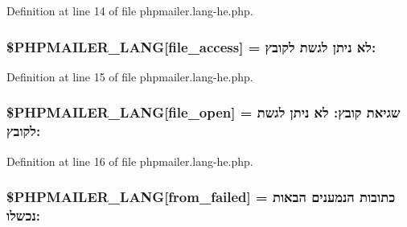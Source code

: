 Definition at line 14 of file phpmailer.\+lang-\/he.\+php.

\subsubsection[{\texorpdfstring{\$\+P\+H\+P\+M\+A\+I\+L\+E\+R\+\_\+\+L\+A\+NG}{$PHPMAILER_LANG}}]{\setlength{\rightskip}{0pt plus 5cm}\$P\+H\+P\+M\+A\+I\+L\+E\+R\+\_\+\+L\+A\+NG\mbox{[}\textquotesingle{}file\+\_\+access\textquotesingle{}\mbox{]} = \textquotesingle{}לא ניתן לגשת לקובץ\+: \textquotesingle{}}\hypertarget{phpmailer_8lang-he_8php_a7e83349023b856ef9e5c46e30ae6d51e}{}\label{phpmailer_8lang-he_8php_a7e83349023b856ef9e5c46e30ae6d51e}


Definition at line 15 of file phpmailer.\+lang-\/he.\+php.

\subsubsection[{\texorpdfstring{\$\+P\+H\+P\+M\+A\+I\+L\+E\+R\+\_\+\+L\+A\+NG}{$PHPMAILER_LANG}}]{\setlength{\rightskip}{0pt plus 5cm}\$P\+H\+P\+M\+A\+I\+L\+E\+R\+\_\+\+L\+A\+NG\mbox{[}\textquotesingle{}file\+\_\+open\textquotesingle{}\mbox{]} = \textquotesingle{}שגיאת קובץ\+: לא ניתן לגשת לקובץ\+: \textquotesingle{}}\hypertarget{phpmailer_8lang-he_8php_a28d1a6517bf4c942a0ddd506188ad2e0}{}\label{phpmailer_8lang-he_8php_a28d1a6517bf4c942a0ddd506188ad2e0}


Definition at line 16 of file phpmailer.\+lang-\/he.\+php.

\subsubsection[{\texorpdfstring{\$\+P\+H\+P\+M\+A\+I\+L\+E\+R\+\_\+\+L\+A\+NG}{$PHPMAILER_LANG}}]{\setlength{\rightskip}{0pt plus 5cm}\$P\+H\+P\+M\+A\+I\+L\+E\+R\+\_\+\+L\+A\+NG\mbox{[}\textquotesingle{}from\+\_\+failed\textquotesingle{}\mbox{]} = \textquotesingle{}כתובות הנמענים הבאות נכשלו\+: \textquotesingle{}}\hypertarget{phpmailer_8lang-he_8php_adf832ae12155a09be077c6d5e4fd7e22}{}\label{phpmailer_8lang-he_8php_adf832ae12155a09be077c6d5e4fd7e22}


